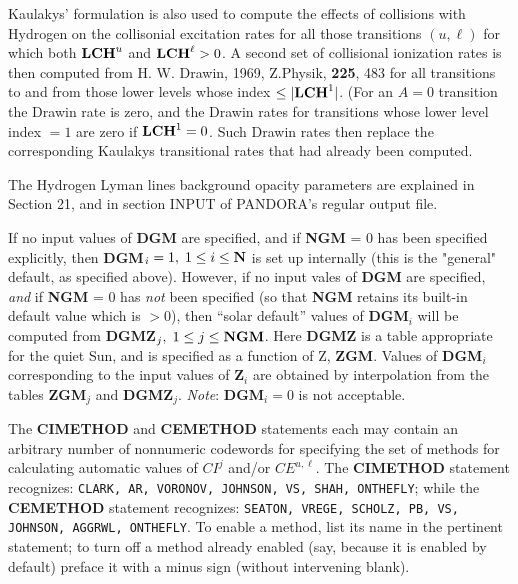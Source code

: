 Kaulakys' formulation is also used to compute the effects of collisions
with Hydrogen on the collisonial excitation rates for all those transitions
$(u,\ell)$ for which both ${\bf LCH}^u$ and ${\bf LCH}^\ell > 0$. A
second set of collisional ionization rates is then
computed from H. W. Drawin, 1969, Z.Physik, {\bf 225}, 483
for all transitions to and from those lower levels whose
index $\leq |{\bf LCH}^1|$. (For an $A = 0$ transition the Drawin rate
is zero, and the Drawin rates for transitions whose lower level
index $= 1$ are zero if ${\bf LCH}^1 = 0$. Such Drawin rates then replace the 
corresponding Kaulakys transitional rates that had already been computed.
\blankline
\blankline
\centerline{}
\space \noindent
The Hydrogen Lyman lines background opacity parameters are explained in
Section 21, and in section INPUT of PANDORA's regular output file.
\blankline
\blankline
\centerline{}
\space \noindent
If no input values of {\bf DGM} are specified, and if {\bf NGM} = 0
has been specified explicitly, then {\bf DGM}$_i = 1, \; 1 \leq i \leq {\bf N}$
is set up internally (this is the "general" default, as specified above).
However, if no input vales of {\bf DGM} are specified, {\it and} if
{\bf NGM} = 0 has {\it not} been specified (so that {\bf NGM} retains its
built-in default value which is $> 0$), then ``solar default'' values of
{\bf DGM}$_i$ will be computed from {\bf DGMZ}$_j, \; 1 \leq j \leq {\bf NGM}$.
Here {\bf DGMZ} is a table appropriate for the quiet Sun, and is
specified as a function of Z, {\bf ZGM}. Values of {\bf DGM}$_i$
corresponding to the input values of {\bf Z}$_i$ are obtained by
interpolation from the tables {\bf ZGM}$_j$ and {\bf DGMZ}$_j$. \np
{\it Note}: {\bf DGM}$_i = 0$ is not acceptable.
\ej
\centerline{}
\space \noindent
The {\bf CIMETHOD} and {\bf CEMETHOD} statements each may contain an arbitrary
number of nonnumeric codewords for specifying the set of methods for
calculating automatic values of $CI^j$ and/or $CE^{u,\ell}$.
The {\bf CIMETHOD} statement recognizes: {\tt CLARK, AR, VORONOV, JOHNSON,
VS, SHAH, ONTHEFLY}; while the {\bf CEMETHOD} statement recognizes: {\tt SEATON,
VREGE, SCHOLZ, PB, VS, JOHNSON, AGGRWL, ONTHEFLY}. To enable a method, list
its name in the pertinent statement; to turn off a method already enabled
(say, because it is enabled by default) preface it with a minus sign (without
intervening blank).

